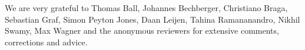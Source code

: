 \documentclass[sigconf]{acmart}
\begin{document}
\begin{acks}
  We are very grateful to
  Thomas Ball,
  Johannes Bechberger,
  Christiano Braga,
  Sebastian Graf,
  Simon Peyton Jones,
  Daan Leijen,
  Tahina Ramananandro,
  Nikhil Swamy,
  Max Wagner
  and the anonymous reviewers
  for extensive comments, corrections and advice.
\end{acks}



\end{document}

